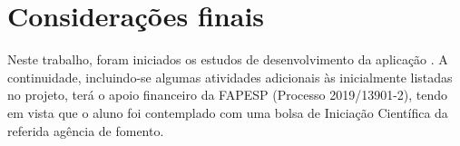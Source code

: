 \chapter{Considerações finais} \label{sec:conclusao}
Neste trabalho, foram iniciados os estudos de desenvolvimento da aplicação \crossword. A continuidade, incluindo-se algumas atividades adicionais às inicialmente listadas no projeto, terá o apoio financeiro da FAPESP (Processo 2019/13901-2), tendo em vista que o aluno foi contemplado com uma bolsa de Iniciação Científica da referida agência de fomento.
